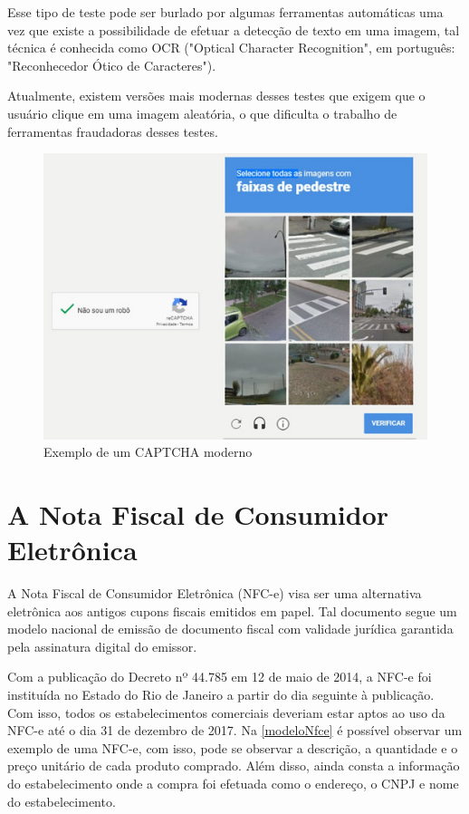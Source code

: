 Esse tipo de teste pode ser burlado por algumas ferramentas automáticas uma vez que existe a possibilidade de efetuar a detecção de texto em uma imagem, tal técnica é conhecida como OCR ("Optical Character Recognition", em português: "Reconhecedor Ótico de Caracteres").\cite{captchaExame}

Atualmente, existem versões mais modernas desses testes que exigem que o usuário clique em uma imagem aleatória, o que dificulta o trabalho de ferramentas fraudadoras desses testes.\cite{captchaExame}

\begin{figure}[h]
    \centering
    \includegraphics[scale=0.15]{tcc/figures/captcha/recaptcha-post-g1.jpg}
    \caption{Exemplo de um CAPTCHA moderno}
    \label{fig-exemplo-captcha-alfanumerico}
\end{figure}

\section{A Nota Fiscal de Consumidor Eletrônica}\label{secNfce}

A Nota Fiscal de Consumidor Eletrônica (NFC-e) visa ser uma alternativa eletrônica aos antigos cupons fiscais emitidos em papel. Tal documento segue um modelo nacional de emissão de documento fiscal com validade jurídica garantida pela assinatura digital do emissor.

Com a publicação do Decreto nº 44.785 em 12 de maio de 2014, a NFC-e foi instituída no Estado do Rio de Janeiro a partir do dia seguinte à publicação. Com isso, todos os estabelecimentos comerciais deveriam estar aptos ao uso da NFC-e até o dia 31 de dezembro de 2017\cite{nfceDefinicao}. Na \autoref{modeloNfce} é possível observar um exemplo de uma NFC-e, com isso, pode se observar a descrição, a quantidade e o preço unitário de cada produto comprado. Além disso, ainda consta a informação do estabelecimento onde a compra foi efetuada como o endereço, o CNPJ e nome do estabelecimento.

